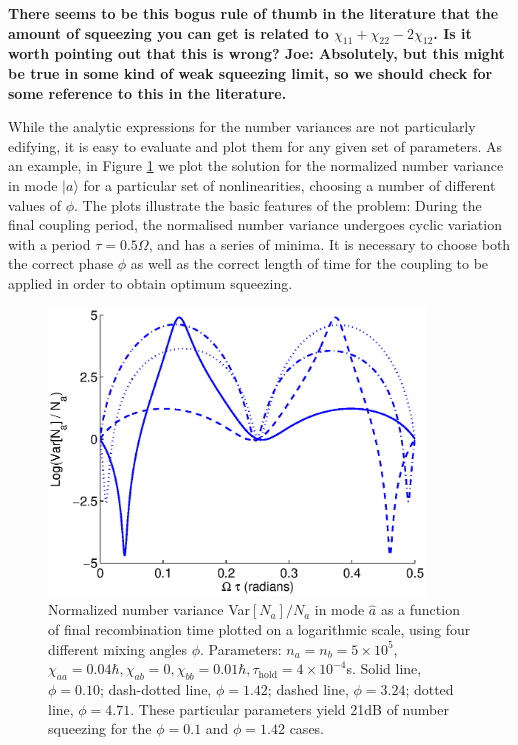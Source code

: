 \documentclass{iopart}
\begin{document}
{\bf{There seems to be this bogus rule of thumb in the literature that the amount of squeezing you can get is related to $\chi_{11}+\chi_{22}-2\chi_{12}$. Is it worth pointing out that this is wrong?  Joe:  Absolutely, but this might be true in some kind of weak squeezing limit, so we should check for some reference to this in the literature.}}

While the analytic expressions for the number variances are not particularly edifying, it is easy to evaluate and plot them for any given set of parameters. As an example, in Figure \ref{figTwoModeAnalyticExamples} we plot the solution for the normalized number variance in mode $|a\rangle$ for a particular set of nonlinearities, choosing a number of different values of $\phi$. The plots illustrate the basic features of the problem: During the final coupling period, the normalised number variance undergoes cyclic variation with a period $\tau=0.5 \Omega$, and has a series of minima. It is necessary to choose both the correct phase $\phi$ as well as the correct length of time for the coupling to be applied in order to obtain optimum squeezing.

\begin{figure}
    \centering
    \includegraphics[width=10cm]{figures/analytic_two_mode_examples.eps}
    \caption{Normalized number variance Var$[N_a]/N_a$ in mode $\hat{a}$ as a function of final recombination time plotted on a logarithmic scale, using four different mixing angles $\phi$. Parameters: $n_a = n_b =5 \times 10^5$, $\chi_{aa}=0.04 \hbar, \chi_{ab}=0, \chi_{bb}=0.01\hbar, \tau_{\mathrm{hold}}=4\times 10^{-4}$s. Solid line, $\phi=0.10$; dash-dotted line, $\phi=1.42$; dashed line, $\phi=3.24$; dotted line, $\phi=4.71$. These particular parameters yield 21dB of number squeezing for the $\phi=0.1$ and $\phi=1.42$ cases.} 
    \label{figTwoModeAnalyticExamples}
\end{figure}
\end{document}

